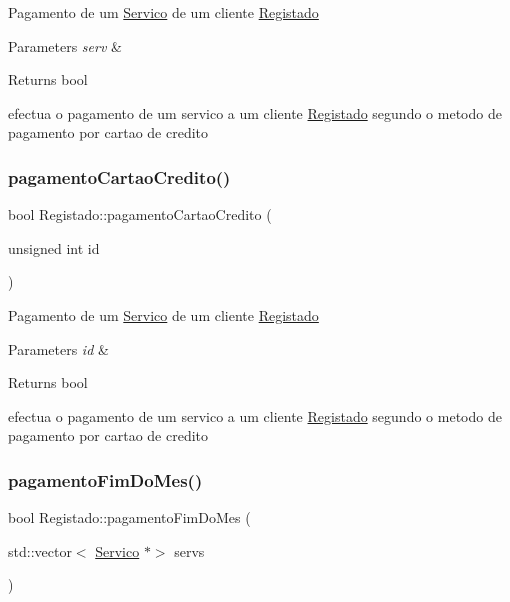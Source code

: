 Pagamento de um \hyperlink{class_servico}{Servico} de um cliente \hyperlink{class_registado}{Registado}


\begin{DoxyParams}{Parameters}
{\em serv} & \\
\hline
\end{DoxyParams}
\begin{DoxyReturn}{Returns}
bool
\end{DoxyReturn}
efectua o pagamento de um servico a um cliente \hyperlink{class_registado}{Registado} segundo o metodo de pagamento por cartao de credito \mbox{\label{class_registado_a957b62d73c6ea619fb29e63255e11b12}} 
\subsubsection{\texorpdfstring{pagamento\+Cartao\+Credito()}{pagamentoCartaoCredito()}\hspace{0.1cm}{\footnotesize\ttfamily [2/2]}}
{\footnotesize\ttfamily bool Registado\+::pagamento\+Cartao\+Credito (\begin{DoxyParamCaption}\item[{unsigned int}]{id }\end{DoxyParamCaption})\hspace{0.3cm}{\ttfamily [virtual]}}

Pagamento de um \hyperlink{class_servico}{Servico} de um cliente \hyperlink{class_registado}{Registado}


\begin{DoxyParams}{Parameters}
{\em id} & \\
\hline
\end{DoxyParams}
\begin{DoxyReturn}{Returns}
bool
\end{DoxyReturn}
efectua o pagamento de um servico a um cliente \hyperlink{class_registado}{Registado} segundo o metodo de pagamento por cartao de credito \mbox{\label{class_registado_a87218f9b1e1aa767c6c77b71f38cca55}} 
\subsubsection{\texorpdfstring{pagamento\+Fim\+Do\+Mes()}{pagamentoFimDoMes()}\hspace{0.1cm}{\footnotesize\ttfamily [1/2]}}
{\footnotesize\ttfamily bool Registado\+::pagamento\+Fim\+Do\+Mes (\begin{DoxyParamCaption}\item[{std\+::vector$<$ \hyperlink{class_servico}{Servico} $\ast$$>$}]{servs }\end{DoxyParamCaption})\hspace{0.3cm}{\ttfamily [virtual]}}

